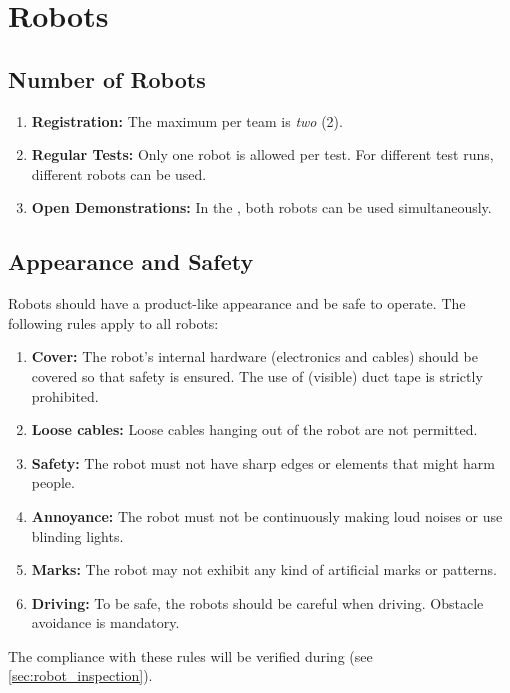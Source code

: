 \section{Robots}
\label{rule:robots}

\subsection{Number of Robots}
\label{rule:robots_number}

\begin{enumerate}
	\item \textbf{Registration:} The maximum  per team is \emph{two} (2).
	\item \textbf{Regular Tests:} Only one robot is allowed per test. For different test runs, different robots can be used.
	\item \textbf{Open Demonstrations:} In the \FINAL, both robots can be used simultaneously.
\end{enumerate}

\subsection{Appearance and Safety}
\label{rule:robot_appearance}

Robots should have a product-like appearance and be safe to operate.
The following rules apply to all robots:
\begin{enumerate}
	\item \textbf{Cover:} The robot's internal hardware (electronics and cables) should be covered so that safety is ensured. The use of (visible) duct tape is strictly prohibited.
	\item \textbf{Loose cables:} Loose cables hanging out of the robot are not permitted.
	\item \textbf{Safety:} The robot must not have sharp edges or elements that might harm people.
	\item \textbf{Annoyance:} The robot must not be continuously making loud noises or use blinding lights.
	\item \textbf{Marks:} The robot may not exhibit any kind of artificial marks or patterns.
	\item \textbf{Driving:} To be safe, the robots should be careful when driving. Obstacle avoidance is mandatory.
\end{enumerate}
The compliance with these rules will be verified during \RobotInspection{} (see \ref{sec:robot_inspection}).







